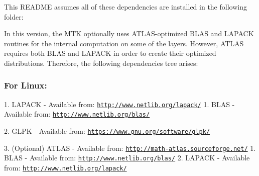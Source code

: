 \begin{DoxyPre}\end{DoxyPre}



\begin{DoxyPre}This README assumes all of these dependencies are installed in the following
folder:\end{DoxyPre}



\begin{DoxyPre}
\end{DoxyPre}



\begin{DoxyPre}In this version, the MTK optionally uses ATLAS-optimized BLAS and LAPACK
routines for the internal computation on some of the layers. However, ATLAS
requires both BLAS and LAPACK in order to create their optimized distributions.
Therefore, the following dependencies tree arises:\end{DoxyPre}



\begin{DoxyPre}\subsubsection*{For Linux:}\end{DoxyPre}



\begin{DoxyPre}\end{DoxyPre}



\begin{DoxyPre}1. LAPACK - Available from: \href{http://www.netlib.org/lapack/}{\tt http://www.netlib.org/lapack/}
  1. BLAS - Available from: \href{http://www.netlib.org/blas/}{\tt http://www.netlib.org/blas/}\end{DoxyPre}



\begin{DoxyPre}2. GLPK - Available from: \href{https://www.gnu.org/software/glpk/}{\tt https://www.gnu.org/software/glpk/}\end{DoxyPre}



\begin{DoxyPre}3. (Optional) ATLAS - Available from: \href{http://math-atlas.sourceforge.net/}{\tt http://math-atlas.sourceforge.net/}
  1. BLAS - Available from: \href{http://www.netlib.org/blas/}{\tt http://www.netlib.org/blas/}
  2. LAPACK - Available from: \href{http://www.netlib.org/lapack/}{\tt http://www.netlib.org/lapack/}\end{DoxyPre}



